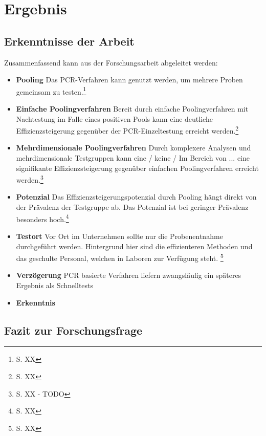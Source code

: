 \chapter{Ergebnis}
\section{Erkenntnisse der Arbeit}
Zusammenfassend kann aus der Forschungsarbeit abgeleitet werden:

\begin{itemize}
	\item \textbf{Pooling} Das PCR-Verfahren kann genutzt werden, um mehrere Proben gemeinsam zu testen.\footnote{S. XX}
	\item \textbf{Einfache Poolingverfahren} Bereit durch einfache Poolingverfahren mit Nachtestung im Falle eines positiven Pools kann eine deutliche Effizienzsteigerung gegenüber der PCR-Einzeltestung erreicht werden.\footnote{S. XX}
	\item \textbf{Mehrdimensionale Poolingverfahren} Durch komplexere Analysen und mehrdimensionale Testgruppen kann eine / keine / Im Bereich von ... eine signifikante Effizienzsteigerung gegenüber einfachen Poolingverfahren erreicht werden.\footnote{S. XX - TODO}
	\item \textbf{Potenzial} Das Effizienzsteigerungspotenzial durch Pooling hängt direkt von der Prävalenz der Testgruppe ab. Das Potenzial ist bei geringer Prävalenz besonders hoch.\footnote{S. XX}
	\item \textbf{Testort} Vor Ort im Unternehmen sollte nur die Probenentnahme durchgeführt werden. Hintergrund hier sind die effizienteren Methoden und das geschulte Personal, welchen in Laboren zur Verfügung steht. \footnote{S. XX}
	\item \textbf{Verzögerung} PCR basierte Verfahren liefern zwangsläufig ein späteres Ergebnis als Schnelltests
	\item \textbf{Erkenntnis} 
	
\end{itemize}

\cleardoublepage
\section{Fazit zur Forschungsfrage}


